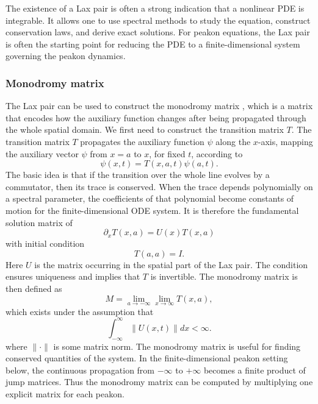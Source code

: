 \documentclass[english,master]{liumaiex}
\theoremstyle{thesisplain}
\theoremstyle{thesisdefinition}
\numberwithin{equation}{section}
\begin{document}
The existence of a Lax pair is often a strong indication that a nonlinear PDE is integrable. It allows one to use spectral methods to study the equation, construct conservation laws, and derive exact solutions. For peakon equations, the Lax pair is often the starting point for reducing the PDE to a finite-dimensional system governing the peakon dynamics.

\subsubsection*{Monodromy matrix}
The Lax pair can be used to construct the monodromy matrix \cite{Avendano_2008,Krishnaswami_2021}, which is a matrix that encodes how the auxiliary function changes after being propagated through the whole spatial domain. We first need to construct the transition matrix $T$. The transition matrix $T$ propagates the auxiliary function $\psi$ along the $x$-axis, mapping the auxiliary vector $\psi$ from $x=a$ to $x$, for fixed $t$, according to
\begin{equation}
    \psi(x,t) = T(x,a,t)\psi(a,t).
\end{equation}
The basic idea is that if the transition over the whole line evolves by a commutator, then its trace is conserved. When the trace depends polynomially on a spectral parameter, the coefficients of that polynomial become constants of motion for the finite-dimensional ODE system. It is therefore the fundamental solution matrix of
\begin{equation} \label{eq:Transition-Matrix}
	\partial_x T(x,a) = U(x) T(x,a)
\end{equation}
with initial condition
\begin{equation}
	T(a,a) = I.
\end{equation}
Here $U$ is the matrix occurring in the spatial part of the Lax pair. The condition ensures uniqueness and implies that $T$ is invertible. The monodromy matrix is then defined as
\begin{equation}
	M =
		\lim_{a \rightarrow -\infty} \lim_{x \rightarrow \infty} T(x,a),
\end{equation}
which exists under the assumption that
\begin{equation}
	\int_{-\infty}^{\infty} \lVert U(x,t) \rVert dx < \infty.
\end{equation}
where $\lVert \cdot \rVert$ is some matrix norm. The monodromy matrix is useful for finding conserved quantities of the system.
In the finite-dimensional peakon setting below, the continuous propagation from $-\infty$ to $+\infty$ becomes a finite product of jump matrices. Thus the monodromy matrix can be computed by multiplying one explicit matrix for each peakon.
\end{document}
